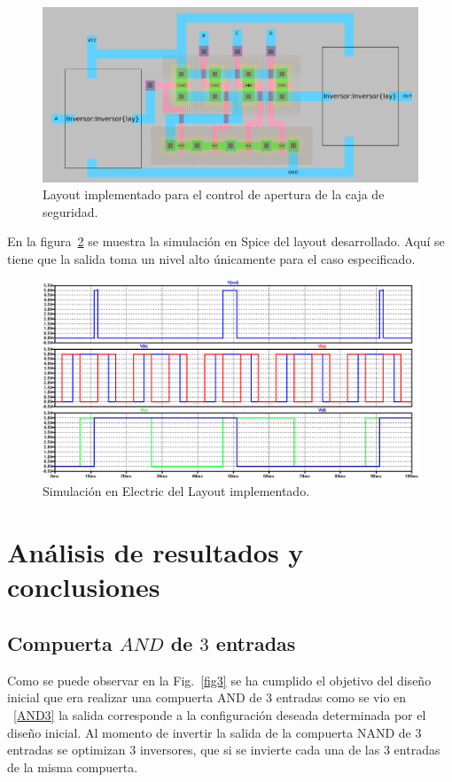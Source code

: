 \documentclass[twocolumn]{IEEEtran}
\begin{document}
\begin{figure}[H]
  \centering
    \includegraphics[scale=0.24]{./pics/layoutcaja.png}
      \caption{Layout implementado para el control de apertura de la caja de seguridad.}
	\label{fcaja}
\end{figure}

En la figura~\ref{scaja} se muestra la simulación en Spice del layout desarrollado. Aquí se tiene que la salida toma un nivel alto únicamente para el caso especificado.

\begin{figure}[H]
  \centering
    \includegraphics[scale=0.19]{./pics/salida_caja.png}
      \caption{Simulación en Electric del Layout implementado.}
	\label{scaja}
\end{figure}

\section{Análisis de resultados y conclusiones}
\subsection{Compuerta $AND$ de $3$ entradas}
\noindent
Como se puede observar en la Fig.~\ref{fig3} se ha cumplido el objetivo del diseño inicial que era realizar una compuerta AND de $3$ entradas como se vio en ~\ref{AND3} la salida corresponde a la configuración deseada determinada por el diseño inicial. Al momento de invertir la salida de la compuerta NAND de $3$ entradas se optimizan 3 inversores, que si se invierte cada una de las $3$ entradas de la misma compuerta.
\end{document}

